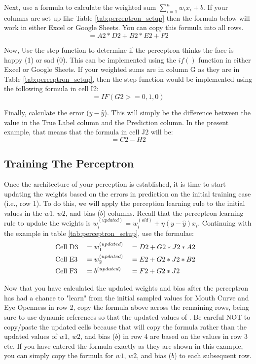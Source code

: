 Next, use a formula to calculate the weighted sum $\sum_{i=1}^nw_ix_i+b$.  If your columns are set up like Table \ref{tab:perceptron_setup} then the formula below will work in either Excel or Google Sheets. You can copy this formula into all rows.
\[
=A2 * D2 + B2 * E2 + F2
\]

Now, Use the step function to determine if the perceptron thinks the face is happy (1) or sad (0). This can be implemented using the $if()$ function in either Excel or Google Sheets.  If your weighted sums are in column G as they are in Table \ref{tab:perceptron_setup}, then the step function would be implemented using the following formula in cell I2:
\[
= IF(G2 >= 0, 1, 0)
\]

Finally, calculate the error ($y-\hat y$).  This will simply be the difference between the value in the True Label column and the Prediction column. In the present example, that means that the formula in cell J2 will be:
\[
= C2 - H2
\]

\subsection{Training The Perceptron}
Once the architecture of your perception is established, it is time to start updating the weights based on the errors in prediction on the initial training case (i.e., row 1).  To do this, we will apply the perception learning rule to the initial values in the $w1$, $w2$, and bias ($b$) columns.  Recall that the perceptron learning rule to update the weights is $w_i^{(updated)}=w_i^{(old)}+\eta(y-\hat{y})x_i$. Continuing with the example in table \ref{tab:perceptron_setup}, use the formulae:
\begin{alignat*}{3}
&\text{Cell D3} &&= w_1^{(updated)} &&= D2+G2*J2*A2 \text{\hspace{.3cm}} \\
&\text{Cell E3} &&= w_2^{(updated)} &&= E2+G2*J2*B2 \text{\hspace{.3cm}} \\
&\text{Cell F3} &&= b^{(updated)} &&= F2+G2*J2  \text{\hspace{.3cm}}
\end{alignat*}

Now that you have calculated the updated weights and bias after the perceptron has had a chance to "learn" from the initial sampled values for Mouth Curve and Eye Openness in row 2, copy the formula above across the remaining rows, being sure to use dynamic references so that the updated values of .  Be careful NOT to copy/paste the updated cells because that will copy the formula rather than the updated values of $w1$, $w2$, and bias ($b$) in row 4 are based on the values in row 3 etc. If you have entered the formula exactly as they are shown in this example, you can simply copy the formula for $w1$, $w2$, and bias ($b$) to each subsequent row. 

